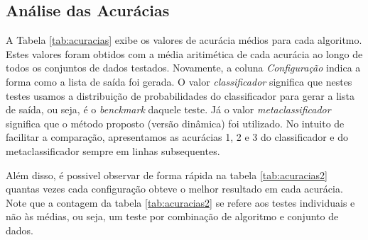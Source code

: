 \subsection{Análise das Acurácias}

A Tabela \ref{tab:acuracias} exibe os valores de acurácia médios para cada algoritmo. 
Estes valores foram obtidos com a média aritimética de cada acurácia ao longo de todos os conjuntos de dados testados.
Novamente, a coluna \textit{Configuração} indica a forma como a lista de saída foi gerada. 
O valor \textit{classificador} significa que nestes testes usamos a distribuição de probabilidades do classificador para gerar a lista de saída, ou seja, é o \textit{benckmark} daquele teste.
Já o valor \textit{metaclassificador} significa que o método proposto (versão dinâmica) foi utilizado.
No intuito de facilitar a comparação, apresentamos as acurácias 1, 2 e 3 do classificador e do metaclassificador sempre em linhas subsequentes.

Além disso, é possivel observar de forma rápida na tabela \ref{tab:acuracias2} quantas vezes cada configuração obteve o melhor resultado em cada acurácia.
Note que a contagem da tabela \ref{tab:acuracias2} se refere aos testes individuais e não às médias, ou seja, um teste por combinação de algoritmo e conjunto de dados.


